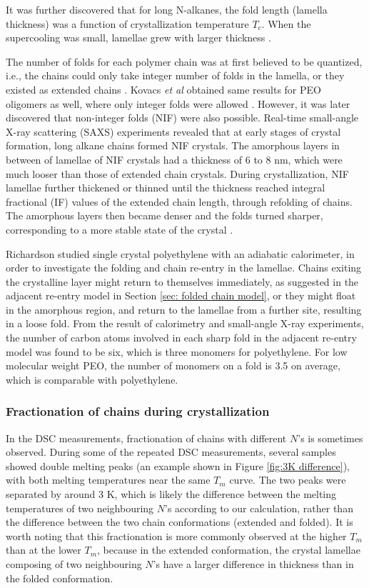 It was further discovered that for long N-alkanes, the fold length (lamella thickness) was a function of crystallization temperature $T_{c}$. When the supercooling was small, lamellae grew with larger thickness \cite{Ungar1986}. 

The number of folds for each polymer chain was at first believed to be quantized, i.e., the chains could only take integer number of folds in the lamella, or they existed as extended chains \cite{Ungar1986}. Kovacs \textit{et al} obtained same results for PEO oligomers as well, where only integer folds were allowed \cite{Kovacs1977}. However, it was later discovered that non-integer folds (NIF) were also possible. Real-time small-angle X-ray scattering (SAXS) experiments \cite{Zeng1998} revealed that at early stages of crystal formation, long alkane chains formed NIF crystals. The amorphous layers in between of lamellae of NIF crystals had a thickness of 6 to 8 nm, which were much looser than those of extended chain crystals. During crystallization, NIF lamellae further thickened or thinned until the thickness reached integral fractional (IF) values of the extended chain length, through refolding of chains. The amorphous layers then became denser and the folds turned sharper, corresponding to a more stable state of the crystal \cite{Ungar1986}.

Richardson \cite{Richardson1965} studied single crystal polyethylene with an adiabatic calorimeter, in order to investigate the folding and chain re-entry in the lamellae. Chains exiting the crystalline layer might return to themselves immediately, as suggested in the adjacent re-entry model in Section \ref{sec: folded chain model}, or they might float in the amorphous region, and return to the lamellae from a further site, resulting in a loose fold. From the result of calorimetry and small-angle X-ray experiments, the number of carbon atoms involved in each sharp fold in the adjacent re-entry model was found to be six, which is three monomers for polyethylene. For low molecular weight PEO, the number of monomers on a fold is 3.5 on average, which is comparable with polyethylene.

\subsubsection{Fractionation of chains during crystallization}

In the DSC measurements, fractionation of chains with different $N$'s is sometimes observed. During some of the repeated DSC measurements, several samples showed double melting peaks (an example shown in Figure \ref{fig:3K difference}), with both melting temperatures near the same $T_{m}$ curve. The two peaks were separated by around 3 K, which is likely the difference between the melting temperatures of two neighbouring $N$'s according to our calculation, rather than the difference between the two chain conformations (extended and folded). It is worth noting that this fractionation is more commonly observed at the higher $T_{m}$ than at the lower $T_{m}$, because in the extended conformation, the crystal lamellae composing of two neighbouring $N$'s have a larger difference in thickness than in the folded conformation.

